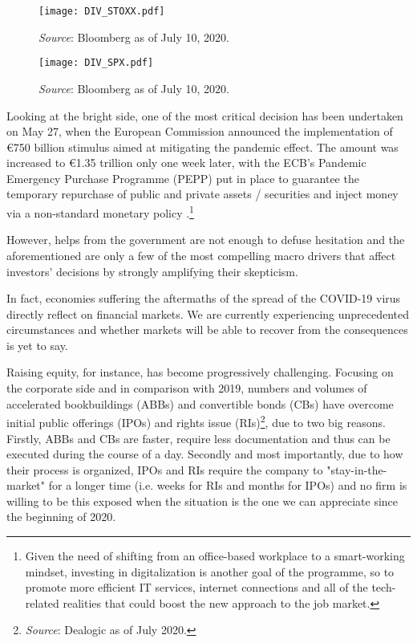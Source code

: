 \documentclass[12pt]{article}
\begin{document}
\begin{figure}[H]
\centering
\begin{minipage}[b]{.5\textwidth}
\centering
{}
\texttt{[image: DIV\_STOXX.pdf]}
\caption*{\textit{Source}: Bloomberg as of July 10, 2020.}
\label{fig:figure1}
\end{minipage}%
\hfill
\begin{minipage}[b]{.5\textwidth}
\centering
{}
\texttt{[image: DIV\_SPX.pdf]}
\caption*{\textit{Source}: Bloomberg as of July 10, 2020.}
\label{fig:figure2}
\end{minipage}
\end{figure}



Looking at the bright side, one of the most critical decision has been undertaken on May 27, when the European Commission announced the implementation of \euro{}750 billion stimulus aimed at mitigating the pandemic effect. The amount was increased to \euro{}1.35 trillion only one week later, with the ECB's Pandemic Emergency Purchase Programme (PEPP) put in place to guarantee the temporary repurchase of public and private assets / securities and inject money via a non-standard monetary policy \cite{pepp}.\footnote{Given the need of shifting from an office-based workplace to a smart-working mindset, investing in digitalization is another goal of the programme, so to promote more efficient IT services, internet connections and all of the tech-related realities that could boost the new approach to the job market.}

However, helps from the government are not enough to defuse hesitation and the aforementioned are only a few of the most compelling macro drivers that affect investors' decisions by strongly amplifying their skepticism.

In fact, economies suffering the aftermaths of the spread of the COVID-19 virus directly reflect on financial markets. We are currently experiencing unprecedented circumstances and whether markets will be able to recover from the consequences is yet to say.

Raising equity, for instance, has become progressively challenging. Focusing on the corporate side and in comparison with 2019, numbers and volumes of accelerated bookbuildings (ABBs) and convertible bonds (CBs) have overcome initial public offerings (IPOs) and rights issue (RIs)\footnote{\textit{Source}: Dealogic as of July 2020.}, due to two big reasons. Firstly, ABBs and CBs are faster, require less documentation and thus can be executed during the course of a day. Secondly and most importantly, due to how their process is organized, IPOs and RIs require the company to "stay-in-the-market" for a longer time (i.e. weeks for RIs and months for IPOs) and no firm is willing to be this exposed when the situation is the one we can appreciate since the beginning of 2020.
\end{document}
